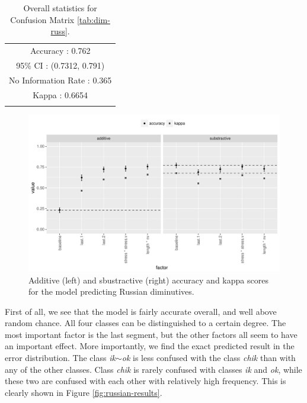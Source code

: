 \begin{table}[!htpb]
  \centering
  \begin{tabular}{llrrr}
    \lsptoprule
    \multicolumn{5}{c}{Overall statistics:} \\

    \midrule
    \multicolumn{5}{c}{Accuracy : 0.762}\\
    \multicolumn{5}{c}{95\% CI : (0.7312, 0.791)}\\
    \multicolumn{5}{c}{No Information Rate : 0.365}\\
    \multicolumn{5}{c}{Kappa : 0.6654}\\
    \lspbottomrule
  \end{tabular}
  \caption{Overall statistics for Confusion Matrix \ref{tab:dim-russ}.}\label{tab:dim-russ-stats}
\end{table}

\begin{figure}[!htpb]
  \centering
  \includegraphics[width=1.0\textwidth]{./figures/russian/factimp-plot.pdf}
    \caption{Additive (left) and sbustractive (right) accuracy and kappa scores for the model predicting Russian diminutives.}\label{fig:factimp-plot-russian}
\end{figure}

First of all, we see that the model is fairly accurate overall, and well above random chance. All four classes can be distinguished to a certain degree. The most important factor is the last segment, but the other factors all seem to have an important effect. More importantly, we find the exact predicted result in the error distribution. The class \textit{ik$\sim$ok} is less confused with the class \textit{chik} than with any of the other classes. Class \textit{chik} is rarely confused with classes \textit{ik} and \textit{ok}, while these two are confused with each other with relatively high frequency. This is clearly shown in Figure \ref{fig:russian-results}.

